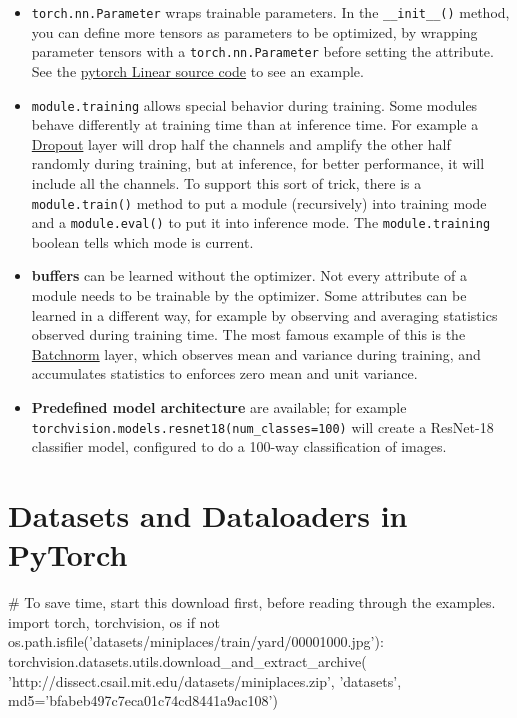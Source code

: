  \begin{itemize}
    \item \texttt{torch.nn.Parameter} wraps trainable parameters. In the \texttt{\_\_init\_\_()} method, you can define more tensors as parameters to be optimized, by wrapping parameter tensors with a \texttt{torch.nn.Parameter} before setting the attribute. See the \href{https://github.com/pytorch/pytorch/blob/main/torch/nn/modules/linear.py#L74-L78}{pytorch Linear source code} to see an example. 
    \item \texttt{module.training} allows special behavior during training. Some modules behave differently at training time than at inference time. For example a \href{https://jmlr.org/papers/volume15/srivastava14a/srivastava14a.pdf}{Dropout} layer will drop half the channels and amplify the other half randomly during training, but at inference, for better performance, it will include all the channels. To support this sort of trick, there is a \texttt{module.train()} method to put a module (recursively) into training mode and a \texttt{module.eval()} to put it into inference mode. The \texttt{module.training} boolean tells which mode is current. 
    \item \textbf{buffers} can be learned without the optimizer. Not every attribute of a module needs to be trainable by the optimizer. Some attributes can be learned in a different way, for example by observing and averaging statistics observed during training time. The most famous example of this is the \href{https://arxiv.org/abs/1502.03167}{Batchnorm} layer, which observes mean and variance during training, and accumulates statistics to enforces zero mean and unit variance.
    \item \textbf{Predefined model architecture} are available; for example \texttt{torchvision.models.resnet18(num\_classes=100)} will create a ResNet-18 classifier model, configured to do a 100-way classification of images. 
 \end{itemize}



 \section{Datasets and Dataloaders in PyTorch}

 \begin{codeblock}[language=python]
# To save time, start this download first, before reading through the examples.
import torch, torchvision, os
if not os.path.isfile('datasets/miniplaces/train/yard/00001000.jpg'):
    torchvision.datasets.utils.download_and_extract_archive(
        'http://dissect.csail.mit.edu/datasets/miniplaces.zip',
        'datasets', md5='bfabeb497c7eca01c74cd8441a9ac108')
\end{codeblock}


